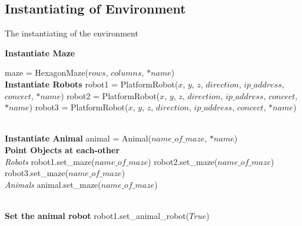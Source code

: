 \subsection{Instantiating of Environment}
\label{function:instantiation}
\begin{algorithm}[H]
\caption{The instantiating of the environment}

\textbf{Instantiate Maze}

\begin{algorithmic}[1]

\bindent{}
\STATE maze = HexagonMaze($rows$, $columns$, $*name$)
\eindent{}
\\ \textbf{Instantiate Robots}
\bindent{}
\STATE robot1 = PlatformRobot($x$, $y$, $z$, $direction$, $ip\_address$, $concect$, $*name$)
\STATE robot2 = PlatformRobot($x$, $y$, $z$, $direction$, $ip\_address$, $concect$, $*name$)
\STATE robot3 = PlatformRobot($x$, $y$, $z$, $direction$, $ip\_address$, $concect$, $*name$)
\eindent{}

\\ \textbf{Instantiate Animal}
\bindent{}
\STATE animal = Animal($name\_of\_maze$, $*name$)
\eindent{}
\\ \textbf{Point Objects at each-other}
\\ \textit{Robots}
\bindent{}
\STATE robot1.set\_maze($name\_of\_maze$)
\STATE robot2.set\_maze($name\_of\_maze$)
\STATE robot3.set\_maze($name\_of\_maze$)
\eindent{}
\\ \textit{Animals}
\bindent{}
\STATE animal.set\_maze($name\_of\_maze$)
\eindent{}

\\ \textbf{Set the animal robot}
\bindent{}
\STATE robot1.set\_animal\_robot($True$) 
\eindent{}

\end{algorithmic}
\end{algorithm}


